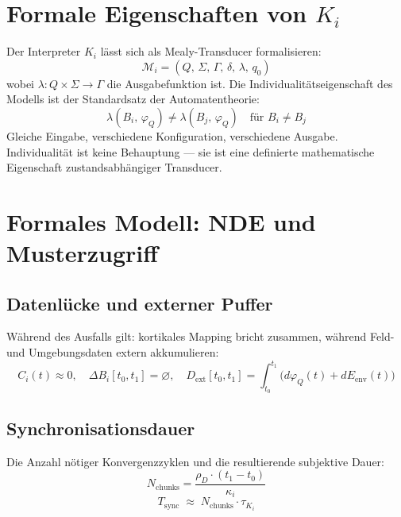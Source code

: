 \documentclass[11pt,a4paper]{article}
\begin{document}
\section{Formale Eigenschaften von $K_i$}
\label{app:formal}

Der Interpreter $K_i$ lässt sich als Mealy-Transducer formalisieren:
\[
  \mathcal{M}_i = (Q,\,\Sigma,\,\Gamma,\,\delta,\,\lambda,\,q_0)
\]
wobei $\lambda\colon Q\times\Sigma\to\Gamma$ die Ausgabefunktion ist.
Die Individualitätseigenschaft des Modells ist der Standardsatz der
Automatentheorie:
\[
  \lambda(B_i,\,\varphi_Q)\neq\lambda(B_j,\,\varphi_Q) \quad \text{für } B_i\neq B_j
\]
Gleiche Eingabe, verschiedene Konfiguration, verschiedene Ausgabe.
Individualität ist keine Behauptung — sie ist eine definierte mathematische
Eigenschaft zustandsabhängiger Transducer.

\section{Formales Modell: NDE und Musterzugriff}
\label{app:nde_formal}

\subsection*{Datenlücke und externer Puffer}

Während des Ausfalls gilt: kortikales Mapping bricht zusammen, während
Feld- und Umgebungsdaten extern akkumulieren:
\begin{equation}
  C_i(t) \approx 0,\quad
  \Delta B_i[t_0,t_1] = \varnothing,\quad
  D_{\mathrm{ext}}[t_0,t_1]
  = \int_{t_0}^{t_1}\!\bigl(d\varphi_Q(t) + dE_{\mathrm{env}}(t)\bigr)
  \label{eq:nde_gap}
\end{equation}

\subsection*{Synchronisationsdauer}

Die Anzahl nötiger Konvergenzzyklen und die resultierende subjektive Dauer:
\begin{equation}
  N_{\mathrm{chunks}} = \frac{\rho_D \cdot (t_1 - t_0)}{\kappa_i}
  \label{eq:nde_nchunks}
\end{equation}
\begin{equation}
  T_{\mathrm{sync}} \;\approx\; N_{\mathrm{chunks}} \cdot \tau_{K_i}
  \label{eq:nde_tsync}
\end{equation}
\end{document}
